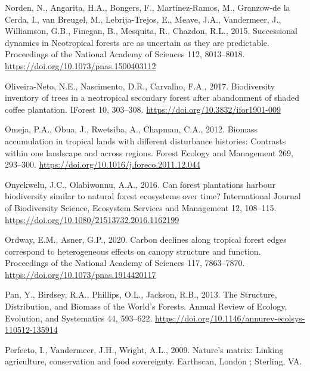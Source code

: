 \documentclass[
  12pt,
]{article}
\newlength{\cslhangindent}
\newlength{\cslentryspacingunit} %
\newenvironment{CSLReferences}[2] %
 {%
  \setlength{\parindent}{0pt}
  \ifodd #1
  \let\oldpar\par
  \def\par{\hangindent=\cslhangindent\oldpar}
  \fi
  \setlength{\parskip}{#2\cslentryspacingunit}
 }%
 {}
\begin{document}
\begin{CSLReferences}{1}{0}
\leavevmode{}%
Norden, N., Angarita, H.A., Bongers, F., Martínez-Ramos, M., Granzow-de la Cerda, I., van Breugel, M., Lebrija-Trejos, E., Meave, J.A., Vandermeer, J., Williamson, G.B., Finegan, B., Mesquita, R., Chazdon, R.L., 2015. Successional dynamics in {Neotropical} forests are as uncertain as they are predictable. Proceedings of the National Academy of Sciences 112, 8013--8018. \url{https://doi.org/10.1073/pnas.1500403112}

\leavevmode{}%
Oliveira-Neto, N.E., Nascimento, D.R., Carvalho, F.A., 2017. Biodiversity inventory of trees in a neotropical secondary forest after abandonment of shaded coffee plantation. IForest 10, 303--308. \url{https://doi.org/10.3832/ifor1901-009}

\leavevmode{}%
Omeja, P.A., Obua, J., Rwetsiba, A., Chapman, C.A., 2012. Biomass accumulation in tropical lands with different disturbance histories: {Contrasts} within one landscape and across regions. Forest Ecology and Management 269, 293--300. \url{https://doi.org/10.1016/j.foreco.2011.12.044}

\leavevmode{}%
Onyekwelu, J.C., Olabiwonnu, A.A., 2016. Can forest plantations harbour biodiversity similar to natural forest ecosystems over time? International Journal of Biodiversity Science, Ecosystem Services and Management 12, 108--115. \url{https://doi.org/10.1080/21513732.2016.1162199}

\leavevmode{}%
Ordway, E.M., Asner, G.P., 2020. Carbon declines along tropical forest edges correspond to heterogeneous effects on canopy structure and function. Proceedings of the National Academy of Sciences 117, 7863--7870. \url{https://doi.org/10.1073/pnas.1914420117}

\leavevmode{}%
Pan, Y., Birdsey, R.A., Phillips, O.L., Jackson, R.B., 2013. The {Structure}, {Distribution}, and {Biomass} of the {World}'s {Forests}. Annual Review of Ecology, Evolution, and Systematics 44, 593--622. \url{https://doi.org/10.1146/annurev-ecolsys-110512-135914}

\leavevmode{}%
Perfecto, I., Vandermeer, J.H., Wright, A.L., 2009. Nature's matrix: Linking agriculture, conservation and food sovereignty. {Earthscan}, {London ; Sterling, VA}.


\end{CSLReferences}
\end{document}
